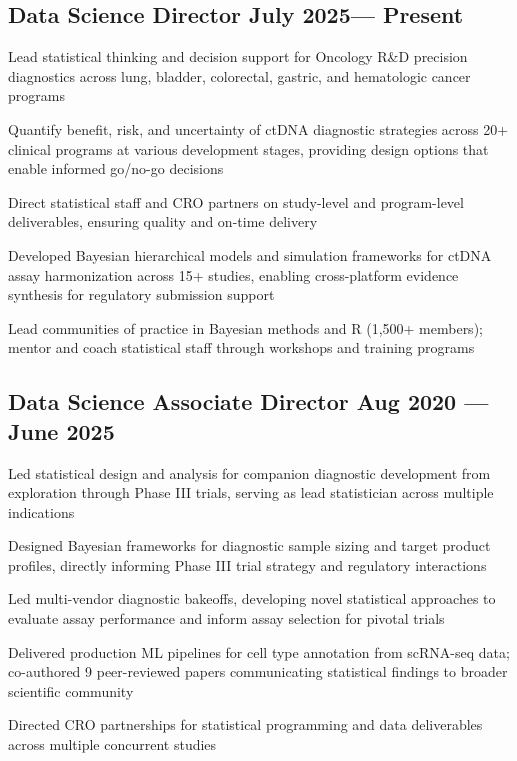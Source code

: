 \subsection{{Data Science Director \hfill July 2025--- Present}}
\begin{zitemize}
    \item Lead statistical thinking and decision support for Oncology R\&D precision diagnostics across lung, bladder, colorectal, gastric, and hematologic cancer programs
    \item Quantify benefit, risk, and uncertainty of ctDNA diagnostic strategies across 20+ clinical programs at various development stages, providing design options that enable informed go/no-go decisions
    \item Direct statistical staff and CRO partners on study-level and program-level deliverables, ensuring quality and on-time delivery
    \item Developed Bayesian hierarchical models and simulation frameworks for ctDNA assay harmonization across 15+ studies, enabling cross-platform evidence synthesis for regulatory submission support
    \item Lead communities of practice in Bayesian methods and R (1,500+ members); mentor and coach statistical staff through workshops and training programs
\end{zitemize}

\subsection{{Data Science Associate Director \hfill Aug 2020 --- June 2025}}
\begin{zitemize}
    \item Led statistical design and analysis for companion diagnostic development from exploration through Phase III trials, serving as lead statistician across multiple indications
    \item Designed Bayesian frameworks for diagnostic sample sizing and target product profiles, directly informing Phase III trial strategy and regulatory interactions
    \item Led multi-vendor diagnostic bakeoffs, developing novel statistical approaches to evaluate assay performance and inform assay selection for pivotal trials
    \item Delivered production ML pipelines for cell type annotation from scRNA-seq data; co-authored 9 peer-reviewed papers communicating statistical findings to broader scientific community
    \item Directed CRO partnerships for statistical programming and data deliverables across multiple concurrent studies
\end{zitemize}

